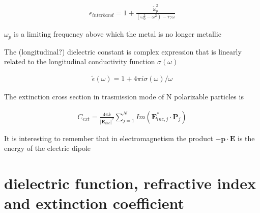 \begin{eqnarray}
	\epsilon_{interband} = 1 + \frac{ \widetilde{ \omega}_p^2 }{ \left( \omega_0^2 - \omega^2 \right) - i\gamma\omega }
\end{eqnarray}

$\omega_p$ is a limiting frequency above which the metal is no longer metallic 

The (longitudinal?) dielectric constant is complex expression that is linearly related to the longitudinal conductivity function $\sigma (\omega)$%

\begin{eqnarray}
	\widetilde{\epsilon}(\omega) = 1 + 4\pi i \sigma(\omega)/\omega
\end{eqnarray}



The extinction cross section in trasmission mode of N polarizable particles is \cite{zhao2003}

\begin{eqnarray}
	C_{ext} = \frac{ 4\pi k }{ | \mathbf{ E}_{inc} |^2 }\sum_{j = 1}^N Im\left( \mathbf{ E}_{inc, j}^*\cdot \mathbf{P}_j \right)
\end{eqnarray}

It is interesting to remember that in electromagnetism the product $-\mathbf{p}\cdot\mathbf{E}$ is the energy of the electric dipole





\section{dielectric function, refractive index and extinction coefficient}



